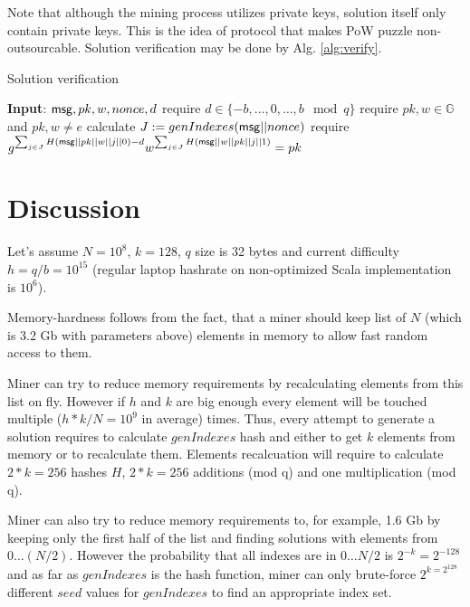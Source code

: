 \documentclass[]{article}
\begin{document}
    Note that although the mining process utilizes private keys, solution itself
    only contain private keys. This is the idea of \Name protocol that makes
    PoW puzzle non-outsourcable. Solution verification may be done by Alg. \ref{alg:verify}.

    \begin{algorithm}[H]
        \caption{Solution verification}
        \label{alg:verify}
        \begin{algorithmic}[1]
            \State \textbf{Input}: $\mathsf{msg},pk,w,nonce,d$
            \State require $d\in\{-b,\dots,0,\dots, b\mod q\}$
            \State require $pk,w\in \mathbb{G}$ and $pk,w \ne e$
            \State calculate $J:=genIndexes(\mathsf{msg}||nonce)$
            \State require $g^{\sum_{j \in J} H(\mathsf{msg}||pk||w||j||0) - d}
            w^{\sum_{j \in J} H(\mathsf{msg}||w||pk||j||1)} = pk$
        \end{algorithmic}
    \end{algorithm}

    \section{Discussion}

    Let's assume $N=10^8$, $k=128$, $q$ size is 32 bytes and current difficulty
    $h = q / b = 10^{15}$ (regular laptop hashrate on non-optimized Scala implementation is $10^6$).

    Memory-hardness follows from the fact, that a miner should keep list of $N$
    (which is 3.2 Gb with parameters above) elements in memory to allow fast random access to them.

    Miner can try to reduce memory requirements by recalculating elements from this list on fly.
    However if $h$ and $k$ are big enough
    every element will be touched multiple ($h * k / N = 10^9$ in average) times.
    Thus, every attempt to generate a solution requires to calculate $genIndexes$ hash and
    either to get $k$ elements from memory or to recalculate them.
    Elements recalcuation will require to calculate $2 * k = 256$ hashes $H$,
    $2 * k = 256$ additions (mod q) and one multiplication (mod q).

    Miner can also try to reduce memory requirements to, for example, 1.6 Gb
    by keeping only the first half of the list and finding solutions
    with elements from $0 \dots (N/2)$.
    However the probability that all indexes are in $0 \dots N/2$ is
    $2^{-k}=2^{-128}$ and as far as $genIndexes$
    is the hash function, miner can only brute-force $2^{k=2^{128}}$ different $seed$ values for $genIndexes$
    to find an appropriate index set.
\end{document}
